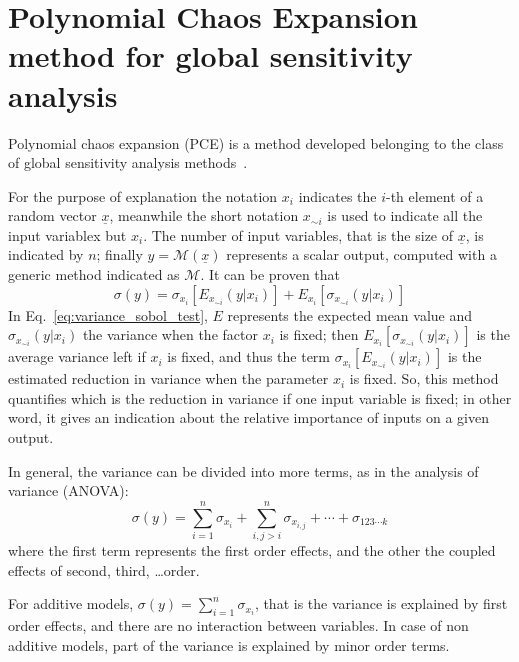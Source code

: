 \chapter{Polynomial Chaos Expansion method for global sensitivity analysis}
\label{app:pce_method}

Polynomial chaos expansion (PCE) is a method developed belonging to the class of global sensitivity analysis methods~\cite{bib:saltelli_2008}. 

For the purpose of explanation the notation $x_i$ indicates the $i$-th element of a random vector $\underline{x}$, meanwhile the short notation $x_{\sim i}$ is used to indicate all the input variablex but $x_i$.
The number of input variables, that is the size of $\underline{x}$, is indicated by $n$; finally $y = \mathcal{M}(\underline{x})$ represents a scalar output, computed with a generic method indicated as $\mathcal{M}$.
It can be proven that~\cite{bib:erto}
\begin{equation}
\label{eq:variance_sobol_test}
\sigma\left(y\right) = \sigma_{x_{i}}\left[E_{x_{\sim i}}\left(y|x_i\right)\right] + E_{x_{i}}\left[\sigma_{x_{\sim i}}\left(y|x_i\right)\right]
\end{equation} 
In Eq.~\eqref{eq:variance_sobol_test}, $E$ represents the expected mean value and $\sigma_{x_{\sim i}}\left(y|x_i\right)$ the variance when the factor $x_i$ is fixed; then $E_{x_{i}}\left[\sigma_{x_{\sim i}}\left(y|x_i\right)\right]$ is the average variance left if $x_i$ is fixed, and thus the term $\sigma_{x_{i}}\left[E_{x_{\sim i}}\left(y|x_i\right)\right]$ is the estimated reduction in variance when the parameter $x_i$ is fixed. 
So, this method quantifies which is the reduction in variance if one input variable is fixed; in other word, it gives an indication about the relative importance of inputs on a given output. 

In general, the variance can be divided into more terms, as in the analysis of variance (ANOVA):
\begin{equation}
\label{eq:variance_anova}
\sigma\left(y\right) = \sum_{i=1}^{n} \sigma_{x_{i}} + \sum_{i, j>i}^{n}\sigma_{x_{i,j}} + \cdots +\sigma_{123\cdots k}
\end{equation}
where the first term represents the first order effects, and the other the coupled effects of second, third, \ldots order. 

For additive models, $\sigma\left(y\right) = \sum_{i=1}^{n} \sigma_{x_{i}}$, that is the variance is explained by first order effects, and there are no interaction between variables. 
In case of non additive models, part of the variance is explained by minor order terms. 

